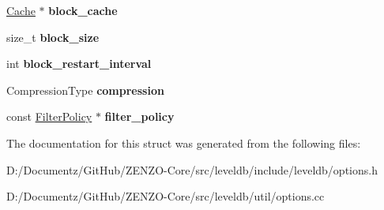 \begin{DoxyCompactItemize}
\item 
\mbox{\label{structleveldb_1_1_options_a4e87749ebac1ba28dff6bb63eb2059e5}} 
\mbox{\hyperlink{classleveldb_1_1_cache}{Cache}} $\ast$ {\bfseries block\+\_\+cache}
\item 
\mbox{\label{structleveldb_1_1_options_a715c7941b43db641e76e598aa9ab52a0}} 
size\+\_\+t {\bfseries block\+\_\+size}
\item 
\mbox{\label{structleveldb_1_1_options_ac71d66ae44e481edc3922d3a139c30b4}} 
int {\bfseries block\+\_\+restart\+\_\+interval}
\item 
\mbox{\label{structleveldb_1_1_options_abdaf09c8bb3a788636ffb86cb93b01ab}} 
Compression\+Type {\bfseries compression}
\item 
\mbox{\label{structleveldb_1_1_options_a24c88997a866d535e68de15b5c3cd02b}} 
const \mbox{\hyperlink{classleveldb_1_1_filter_policy}{Filter\+Policy}} $\ast$ {\bfseries filter\+\_\+policy}
\end{DoxyCompactItemize}


The documentation for this struct was generated from the following files\+:\begin{DoxyCompactItemize}
\item 
D\+:/\+Documentz/\+Git\+Hub/\+Z\+E\+N\+Z\+O-\/\+Core/src/leveldb/include/leveldb/options.\+h\item 
D\+:/\+Documentz/\+Git\+Hub/\+Z\+E\+N\+Z\+O-\/\+Core/src/leveldb/util/options.\+cc\end{DoxyCompactItemize}
